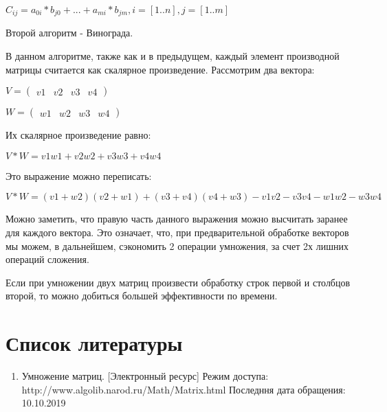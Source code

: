 \documentclass[12pt]{report}
\begin{document}
\begin{center}
{$C_{ij} = a_{0i} * b_{j0} + ... + a_{mi} * b_{jm},  i = [1..n], j = [1..m]$}
\end{center}

Второй алгоритм - Винограда.

В данном алгоритме, также как и в предыдущем, каждый элемент производной матрицы считается как скалярное произведение.
Рассмотрим два вектора:
\begin{center}
{$
V = 
\begin{pmatrix}
  v1 & v2 & v3 & v4
\end{pmatrix}
$}

{$
W = 
\begin{pmatrix}
  w1 & w2 & w3 & w4
\end{pmatrix}
$}
\end{center}

Их скалярное произведение равно:
\begin{center}
{$
V*W = v1w1 + v2w2 + v3w3 + v4w4
$}
\end{center}

Это выражение можно переписать:
\begin{center}
{$
V*W = (v1 + w2)(v2 + w1) + (v3 + v4)(v4 + w3) - v1v2 - v3v4 - w1w2 - w3w4
$}
\end{center}

Можно заметить, что правую часть данного выражения можно высчитать заранее для каждого вектора.
Это означает, что, при предварительной обработке векторов мы можем, в дальнейшем, сэкономить 2 операции умножения, за счет 2х лишних операций сложения.

Если при умножении двух матриц произвести обработку строк первой и столбцов второй, то можно добиться большей эффективности по времени.


















\chapter*{Список литературы}
\begin{enumerate}
	\item Умножение матриц. [Электронный ресурс] Режим доступа: http://www.algolib.narod.ru/Math/Matrix.html Последння дата обращения: 10.10.2019
\end{enumerate}
\end{document}
